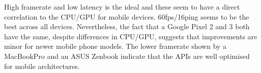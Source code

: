 \documentclass[acmlarge,screen,dvipsnames]{acmart}
\begin{document}
High framerate and low latency is the ideal and these seem to have a direct
correlation to the CPU/GPU for mobile devices. 60fps/16ping seems to be the
best across all devices. Nevertheless, the fact that a Google Pixel 2 and 3 both
have the same, despite differences in CPU/GPU, suggests that improvements are minor
for newer mobile phone models. The lower framerate shown by a MacBookPro
and an ASUS Zenbook indicate that the APIs are well optimised for mobile
architectures.






\end{document}

